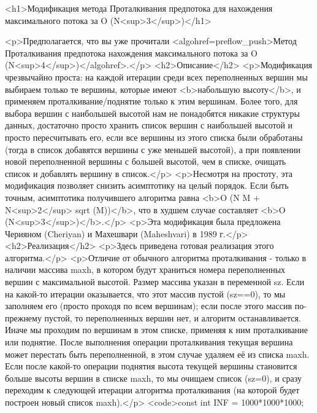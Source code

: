 <h1>Модификация метода Проталкивания предпотока для нахождения максимального потока за O (N<sup>3</sup>)</h1>

<p>Предполагается, что вы уже прочитали <algohref=preflow_push>Метод Проталкивания предпотока нахождения максимального потока за O (N<sup>4</sup>)</algohref>.</p>
<h2>Описание</h2>
<p>Модификация чрезвычайно проста: на каждой итерации среди всех переполненных вершин мы выбираем только те вершины, которые имеют <b>набольшую высоту</b>, и применяем проталкивание/поднятие только к этим вершинам. Более того, для выбора вершин с наибольшей высотой нам не понадобятся никакие структуры данных, достаточно просто хранить список вершин с наибольшей высотой и просто пересчитывать его, если все вершины из этого списка были обработаны (тогда в список добавятся вершины с уже меньшей высотой), а при появлении новой переполненной вершины с большей высотой, чем в списке, очищать список и добавлять вершину в список.</p>
<p>Несмотря на простоту, эта модификация позволяет снизить асимптотику на целый порядок. Если быть точным, асимптотика получившего алгоритма равна <b>O (N M + N<sup>2</sup> sqrt (M))</b>, что в худшем случае составляет <b>O (N<sup>3</sup>)</b>.</p>
<p>Эта модификация была предложена Черияном (Cheriyan) и Махешвари (Maheshvari) в 1989 г.</p>
<h2>Реализация</h2>
<p>Здесь приведена готовая реализация этого алгоритма.</p>
<p>Отличие от обычного алгоритма проталкивания - только в наличии массива maxh, в котором будут храниться номера переполненных вершин с максимальной высотой. Размер массива указан в переменной sz. Если на какой-то итерации оказывается, что этот массив пустой (sz==0), то мы заполняем его (просто проходя по всем вершинам); если после этого массив по-прежнему пустой, то переполненных вершин нет, и алгоритм останавливается. Иначе мы проходим по вершинам в этом списке, применяя к ним проталкивание или поднятие. После выполнения операции проталкивания текущая вершина может перестать быть переполненной, в этом случае удаляем её из списка maxh. Если после какой-то операции поднятия высота текущей вершины становится больше высоты вершин в списке maxh, то мы очищаем список (sz=0), и сразу переходим к следующей итерации алгоритма проталкивания (на которой будет построен новый список maxh).</p>
<code>const int INF = 1000*1000*1000;


